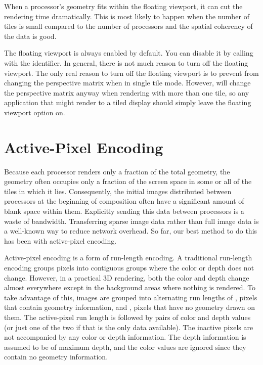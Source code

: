 When a processor's geometry fits within the floating viewport, it can cut
the rendering time dramatically.  This is most likely to happen when the
number of tiles is small compared to the number of processors and the
spatial coherency of the data is good.

The floating viewport is always enabled by default.  You can disable it by
calling  with the 
identifier.  In general, there is not much reason to turn off the floating
viewport.  The only real reason to turn off the floating viewport is to
prevent \IceT from changing the perspective matrix when in single tile
mode.  However, \IceT will change the perspective matrix anyway when
rendering with more than one tile, so any application that might render to
a tiled display should simply leave the floating viewport option on.


\section{Active-Pixel Encoding}
\label{sec:Customizing_Compositing:Active_Pixel_Encoding}

Because each processor renders only a fraction of the total geometry, the
geometry often occupies only a fraction of the screen space in some or all
of the tiles in which it lies.  Consequently, the initial images
distributed between processors at the beginning of composition often have a
significant amount of blank space within them.  Explicitly sending this
data between processors is a waste of bandwidth.  Transferring
sparse image data rather than full image data is a well-known way to reduce
network overhead.  So far, our best method to do this has been with
active-pixel encoding.

Active-pixel encoding is a form of run-length encoding.  A traditional
run-length encoding groups pixels into contiguous groups where the color
or depth does not change.  However, in a practical 3D rendering, both
the color and depth change almost everywhere except in the background areas
where nothing is rendered.  To take advantage of this, images are grouped
into alternating run lengths of , pixels that
contain geometry information, and , pixels that
have no geometry drawn on them.  The active-pixel run length is followed by
pairs of color and depth values (or just one of the two if that is the only
data available).  The inactive pixels are not accompanied by any color or
depth information.  The depth information is assumed to be of maximum
depth, and the color values are ignored since they contain no geometry
information.

